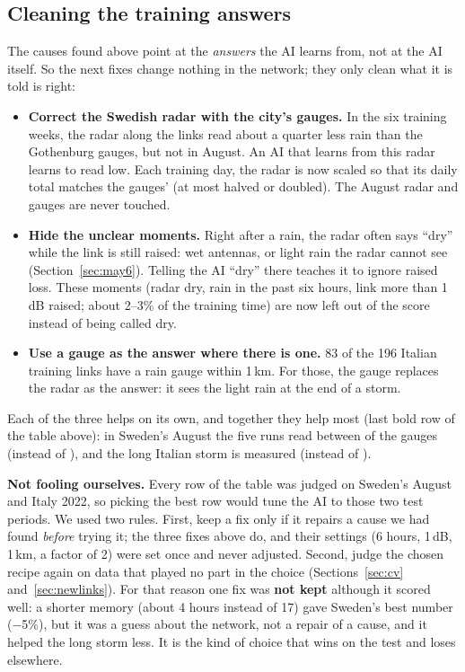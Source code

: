 \subsection{Cleaning the training answers}
\label{sec:recipe}
The causes found above point at the \emph{answers} the AI learns from, not at the AI itself. So the next fixes change
nothing in the network; they only clean what it is told is right:
\begin{itemize}
\item \textbf{Correct the Swedish radar with the city's gauges.} In the six training weeks, the radar along the links
read about a quarter less rain than the Gothenburg gauges, but not in August. An AI that learns from this radar learns to
read low. Each training day, the radar is now scaled so that its daily total matches the gauges' (at most halved or
doubled). The August radar and gauges are never touched.
\item \textbf{Hide the unclear moments.} Right after a rain, the radar often says ``dry'' while the link is still
raised: wet antennas, or light rain the radar cannot see (Section~\ref{sec:may6}). Telling the AI ``dry'' there teaches it
to ignore raised loss. These moments (radar dry, rain in the past six hours, link more than 1\,dB raised; about 2--3\% of
the training time) are now left out of the score instead of being called dry.
\item \textbf{Use a gauge as the answer where there is one.} 83 of the 196 Italian training links have a rain gauge
within 1\,km. For those, the gauge replaces the radar as the answer: it sees the light rain at the end of a storm.
\end{itemize}
Each of the three helps on its own, and together they help most (last bold row of the table above): in Sweden's August
the five runs read between \ExpFinSeRange{} of the gauges (instead of \ExpRelSeRange), and the long Italian storm is
\ExpFinLong{} measured (instead of \ExpRelLong).

\begin{careful}
\textbf{Not fooling ourselves.} Every row of the table was judged on Sweden's August and Italy 2022, so picking the
best row would tune the AI to those two test periods. We used two rules. First, keep a fix only if it repairs a cause we
had found \emph{before} trying it; the three fixes above do, and their settings (6 hours, 1\,dB, 1\,km, a factor of 2) were
set once and never adjusted. Second, judge the chosen recipe again on data that played no part in the choice
(Sections~\ref{sec:cv} and~\ref{sec:newlinks}). For that reason one fix was \textbf{not kept} although it scored well: a
shorter memory (about 4 hours instead of 17) gave Sweden's best number ($-$5\%), but it was a guess about the network,
not a repair of a cause, and it helped the long storm less. It is the kind of choice that wins on the test and loses
elsewhere.
\end{careful}

